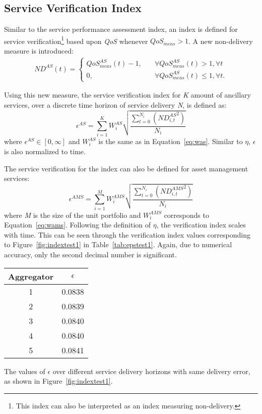 
\subsection{Service Verification Index}
Similar to the service performance assessment index, an index is defined for service verification\footnote{This index can also be interpreted as an index measuring non-delivery.} based upon \emph{QoS} whenever $QoS_{meas} > 1$. A new non-delivery measure is introduced:
\begin{align}
	ND^{AS}(t) = \begin{cases} QoS^{AS}_{meas}(t) - 1,\quad &\forall QoS^{AS}_{meas}(t) > 1, \forall t\\
		0, \quad &\forall QoS^{AS}_{meas}(t) \leq 1, \forall t.
	\end{cases}\label{eq:MAINndasclamp}
\end{align}

Using this new measure, the service verification index for \emph{K} amount of ancillary services, over a discrete time horizon of service delivery \emph{N}, is defined as:
\begin{equation}\label{eq:epsilonASmain}
	\epsilon^{AS} = \sum^{K}_{i=1} W^{AS}_i \sqrt{\frac{\sum^{N_i}_{t=0} \left( {ND^{AS}_{i,t}}^{2} \right)}{N_i}}
\end{equation}
where $\epsilon^{AS} \in [0,\infty]$ and $W^{AS}_i$ is the same as in Equation~\eqref{eq:was}. Similar to $\eta$, $\epsilon$ is also normalized to time.

The service verification for the index can also be defined for asset management services:
\begin{equation}\label{eq:epsilonAMSmain}
	\epsilon^{AMS} = \sum^{M}_{i=1} W^{AMS}_i \sqrt{\frac{\sum^{N_i}_{t=0} \left( {ND^{AMS}_{i,t}}^{2} \right)}{N_i}}
\end{equation}
where  \emph{M} is the size of the unit portfolio and $W^{AMS}_i$ corresponds to Equation~\eqref{eq:wams}. Following the definition of $\eta$, the verification index scales with time. This can be seen through the verification index values corresponding to Figure~\ref{fig:indextest1} in Table~\ref{tab:epstest1}. Again, due to numerical accuracy, only the second decimal number is significant.
\begin{margintable}%
	\centering
	\begin{tabular}{cc}
		\toprule
		Aggregator & $\epsilon$ \\
		\midrule
		1 & 0.0838 \\
		2 & 0.0839  \\
		3 & 0.0840  \\
		4 & 0.0840  \\
		5 & 0.0841 \\
		\bottomrule
	\end{tabular}
	\caption{The values of $\epsilon$ over different service delivery horizons with same delivery error, as shown in Figure~\ref{fig:indextest1}.}
	\label{tab:epstest1}
\end{margintable}

